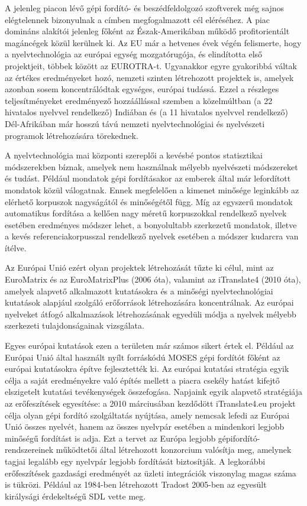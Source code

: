 \begin{multicols}{2}
  A jelenleg piacon lévő gépi fordító- és beszédfeldolgozó szoftverek még sajnos elégtelennek bizonyulnak a címben megfogalmazott cél eléréséhez. A piac do\-mi\-náns alakítói jelenleg főként az Észak-Amerikában működő profitorientált ma\-gán\-cé\-gek közül kerülnek ki. Az EU már a hetvenes évek végén felismerte, hogy a nyelvtechnológia az európai egység mozgatórugója, és elindította első pro\-jekt\-jeit, többek között az EUROTRA-t. Ugyanakkor egyre gyakoribbá váltak az értékes eredményeket hozó, nemzeti szin\-ten létrehozott projektek is, amelyek azonban sosem koncentrálódtak egységes, európai tudássá. Ezzel a részleges teljesítményeket eredményező hozzáállással szemben a közelmúltban (a 22 hivatalos nyelvvel rendelkező) Indiában és (a 11 hivatalos nyelvvel rendelkező) Dél-Afrikában már hosszú távú nemzeti nyelv\-tech\-no\-ló\-giai és nyelvészeti programok létrehozására törekednek. 


  A nyelvtechnológia mai központi szereplői a kevésbé pontos statisztikai módszerekben bíznak, amelyek nem használnak mélyebb nyelvészeti módszereket és tudást. Például mondatok gépi fordításakor az emberek által már lefordított mondatok közül válogatnak. Ennek megfelelően a kimenet minősége leginkább az elérhető korpuszok nagyságától és minőségétől függ. Míg az egyszerű mondatok automatikus fordítása a kellően nagy méretű korpuszokkal rendelkező nyelvek esetében eredményes módszer lehet, a bonyolultabb szerkezetű mondatok, illetve a kevés re\-fe\-ren\-cia\-korpusszal rendelkező nyelvek ese\-té\-ben a módszer kudarcra van ítélve. 

  Az Európai Unió ezért olyan projektek létrehozását tűzte ki célul, mint az EuroMatrix és az EuroMatrixPlus (2006 óta), valamint az iTranslate4 (2010 óta), amelyek alapvető alkalmazott kutatásokra és a minőségi nyelvtechnológiai kutatások alapjául szolgáló erőforrások létrehozására koncentrálnak. Az európai nyelveket átfogó alkalmazások létrehozásának egyedüli módja a nyelvek mélyebb szerkezeti tulajdonságainak vizsgálata.  

  Egyes európai kutatások ezen a területen már számos sikert értek el. Például az Európai Unió által használt nyílt forráskódú MOSES gépi fordítót főként az európai kutatásokra építve fejlesztették ki. Az európai kutatási stratégia egyik célja a saját eredményekre való építés mellett a piacra csekély hatást kifejtő elszigetelt kutatási tevékenységek összefogása. Napjaink egyik alapvető stratégiája az erő\-fe\-szí\-té\-sek egyesítése: a 2010 márciusában kezdődött iTranslate4.eu projekt célja olyan gépi fordító szolgáltatás nyújtása, amely nemcsak lefedi az Európai Unió összes nyelvét, hanem az összes nyelvpár esetében a mindenkori legjobb minőségű fordítást is adja. Ezt a tervet az Európa legjobb gépifordító-rendszereinek működtetői által létrehozott konzorcium valósítja meg, amelynek tagjai legalább egy nyelvpár legjobb fordítását biztosítják. A legkorábbi erőfeszítések gazdasági eredményét az üzleti integrációk viszonylag magas száma is tükrözi. Például az 1984-ben létrehozott Tradost 2005-ben az egyesült királysági érdekeltségű SDL vette meg.


\end{multicols}
